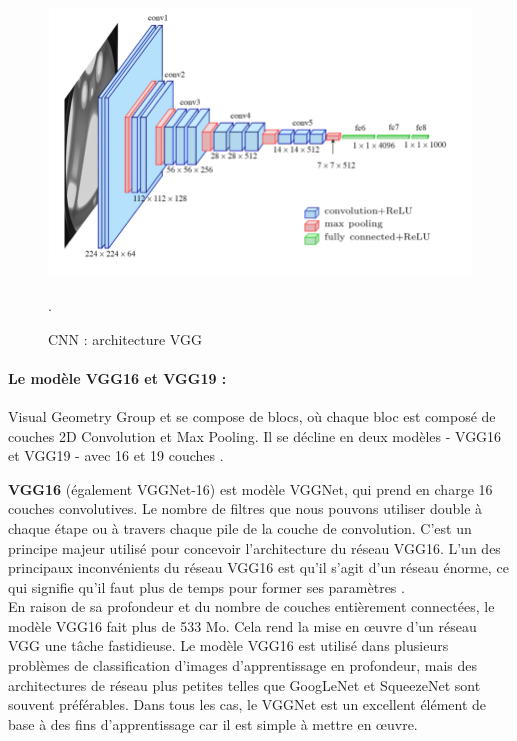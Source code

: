 	
	\begin{figure}[H]%
		\centering
		\includegraphics[width=\textwidth]{images/VGG-16-network-architecture.png}
		\caption{CNN : architecture VGG \cite{ml2008python}}.
		\label{fig:VGG_network}
	\end{figure}

	\paragraph{Le modèle VGG16 et VGG19 :}
	
	Visual Geometry Group et se compose de blocs, où chaque bloc est composé de couches 2D Convolution et Max Pooling. Il se décline en deux modèles - VGG16 et VGG19 - avec 16 et 19 couches \cite{yu2016visualizing}.
	
	\textbf{VGG16} (également VGGNet-16) est modèle VGGNet, qui prend en charge 16 couches convolutives.
	Le nombre de filtres que nous pouvons utiliser double à chaque étape ou à travers chaque pile de la couche de convolution. C'est un principe majeur utilisé pour concevoir l'architecture du réseau VGG16. L'un des principaux inconvénients du réseau VGG16 est qu'il s'agit d'un réseau énorme, ce qui signifie qu'il faut plus de temps pour former ses paramètres \cite{yu2016visualizing}.\\
	En raison de sa profondeur et du nombre de couches entièrement connectées, le modèle VGG16 fait plus de 533 Mo. Cela rend la mise en œuvre d'un réseau VGG une tâche fastidieuse.
	Le modèle VGG16 est utilisé dans plusieurs problèmes de classification d'images d'apprentissage en profondeur, mais des architectures de réseau plus petites telles que GoogLeNet et SqueezeNet sont souvent préférables. Dans tous les cas, le VGGNet est un excellent élément de base à des fins d'apprentissage car il est simple à mettre en œuvre.
	
